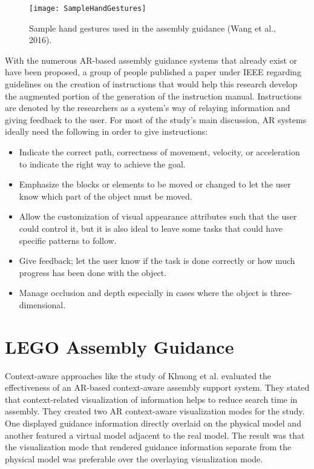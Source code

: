 \begin{figure}[h!]
  \centering
  \texttt{[image: SampleHandGestures]}
  \caption{Sample hand gestures used in the assembly guidance (Wang et al., 2016).}
\end{figure}

With the numerous AR-based assembly guidance systems that already exist or have been proposed, a group of people published a paper under IEEE regarding guidelines on the creation of instructions that would help this research develop the augmented portion of the generation of the instruction manual. Instructions are denoted by the researchers as a system's way of relaying information and giving feedback to the user. For most of the study's main discussion,ِ AR systems ideally need the following in order to give instructions:

\begin{itemize}
	\item Indicate the correct path, correctness of movement, velocity, or acceleration to indicate the right way to achieve the goal.
    \item Emphasize the blocks or elements to be moved or changed to let the user know which part of the object must be moved.
    \item Allow the customization of visual appearance attributes such that the user could control it, but it is also ideal to leave some tasks that could have specific patterns to follow.
    \item Give feedback; let the user know if the task is done correctly or how much progress has been done with the object.
    \item Manage occlusion and depth especially in cases where the object is three-dimensional.
\end{itemize}

\section{LEGO Assembly Guidance}

Context-aware approaches like the study of Khuong et al. evaluated the effectiveness of an AR-based context-aware assembly support system\cite{6802051}. They stated that context-related visualization of information helps to reduce search time in assembly. They created two AR context-aware visualization modes for the study. One displayed guidance information directly overlaid on the physical model and another featured a virtual model adjacent to the real model. The result was that the visualization mode that rendered guidance information separate from the physical model was preferable over the overlaying visualization mode.












